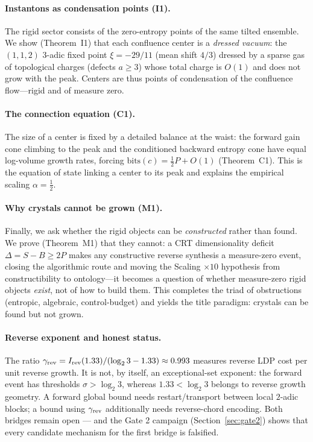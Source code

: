 \documentclass[12pt,a4paper]{article}
\theoremstyle{remark}
\begin{document}
\paragraph{Instantons as condensation points (I1).}
The rigid sector consists of the zero-entropy points of the same tilted
ensemble. We show (Theorem~I1) that each confluence center is a \emph{dressed
vacuum}: the $(1,1,2)$ $3$-adic fixed point $\xi=-29/11$ (mean shift $4/3$)
dressed by a sparse gas of topological charges (defects $a\ge3$) whose total
charge is $O(1)$ and does not grow with the peak. Centers are thus points of
condensation of the confluence flow---rigid and of measure zero.

\paragraph{The connection equation (C1).}
The size of a center is fixed by a detailed balance at the waist: the forward
gain cone climbing to the peak and the conditioned backward entropy cone have
equal log-volume growth rates, forcing $\mathrm{bits}(c)=\tfrac12 P+O(1)$
(Theorem~C1). This is the equation of state linking a center to its peak and
explains the empirical scaling $\alpha=\tfrac12$.

\paragraph{Why crystals cannot be grown (M1).}
Finally, we ask whether the rigid objects can be \emph{constructed} rather than
found. We prove (Theorem~M1) that they cannot: a CRT dimensionality deficit
$\Delta=S-B\ge2P$ makes any constructive reverse synthesis a measure-zero
event, closing the algorithmic route and moving the Scaling $\times10$
hypothesis from constructibility to ontology---it becomes a question of whether
measure-zero rigid objects \emph{exist}, not of how to build them. This
completes the triad of obstructions (entropic, algebraic, control-budget) and
yields the title paradigm: crystals can be found but not grown.

\paragraph{Reverse exponent and honest status.}
The ratio
$\gamma_{\rm rev}=I_{\rm rev}(1.33)/(\log_2 3-1.33)\approx0.993$
measures reverse LDP cost per unit reverse growth.  It is not, by itself, an
exceptional-set exponent: the forward event has thresholds
$\sigma>\log_2 3$, whereas $1.33<\log_2 3$ belongs to reverse growth geometry.
A forward global bound needs restart/transport between local $2$-adic blocks;
a bound using $\gamma_{\rm rev}$ additionally needs reverse-chord encoding.
Both bridges remain open --- and the Gate 2 campaign (Section~\ref{sec:gate2})
shows that every candidate mechanism for the first bridge is falsified.
\end{document}
